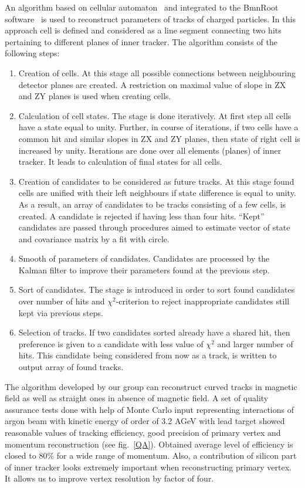 \documentclass{webofc}
\begin{document}
An algorithm based on cellular automaton~\cite{CA} and integrated to the BmnRoot software~\cite{bmnroot} is used to reconstruct parameters of tracks of charged particles.
In this approach cell is defined and considered as a line segment connecting two hits pertaining to different planes of inner tracker.
The algorithm consists of the following steps:
\begin{enumerate}
\item Creation of cells.
  At this stage all possible connections between neighbouring detector planes are created. A restriction on maximal value of slope in ZX and ZY planes is used when creating cells. 
\item Calculation of cell states.
  The stage is done iteratively. %
  At first step all cells have a state equal to unity. Further, in course of iterations, if two cells have a common hit and similar slopes in ZX and ZY planes, then state of right
  cell is increased by unity. Iterations are done over all elements (planes) of inner tracker. It leads to calculation of final states for all cells.
\item Creation of candidates to be considered as future tracks.
  At this stage found cells are unified with their left neighbours if state difference is equal to unity. As a result, an array of candidates to be tracks consisting of a few cells,
  is created. A candidate is rejected if having less than four hits. ``Kept'' candidates are passed through procedures aimed to estimate vector of state and covariance matrix by a
  fit with circle.
\item Smooth of parameters of candidates.
  Candidates are processed by the Kalman filter to improve their parameters found at the previous step.
\item Sort of candidates.
  The stage is introduced in order to sort found candidates over number of hits and $\chi^{2}$-criterion to reject inappropriate candidates still kept via previous steps.
\item Selection of tracks.
  If two candidates sorted already have a shared hit, then preference is given to a candidate with less value of $\chi^{2}$ and larger number of hits. This candidate being considered from now
  as a track, is written to output array of found tracks.     
\end{enumerate}

The algorithm developed by our group can reconstruct curved tracks in magnetic field as well as straight ones in absence of magnetic field.
A set of quality assurance tests done with help of Monte Carlo input representing interactions of argon beam with kinetic energy of order of 3.2 AGeV with lead target showed reasonable values
of tracking efficiency, good precision of primary vertex and momentum reconstruction (see fig.~\ref{QA}).
Obtained average level of efficiency is closed to 80\% for a wide range of momentum. Also, a contribution of silicon part of inner tracker looks extremely important
when reconstructing primary vertex. It allows us to improve vertex resolution by factor of four.
\end{document}

